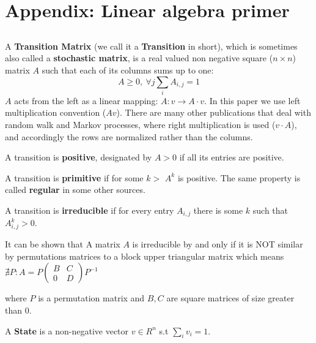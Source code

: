 \section{Appendix: Linear algebra primer}

\subsection*{}

\subsection*{}

\begin{mydef}
\label{Ax:def:transition} A \textbf{Transition Matrix } (we call
it a \textbf{Transition} in short), which is sometimes also called a
\textbf{stochastic matrix}, is a real valued non negative square
($n \times n$) matrix $A$ such that each of its columns sums up to one: $$A
\geq 0,\ \forall j \sum_i A_{i,j} = 1$$ $A$ acts from the left as a
linear mapping: $A:v \to A \cdot v$. In this paper we use left
multiplication convention ($Av$). There are many other publications
that deal with random walk and Markov processes, where right
multiplication is used ($v \cdot A$), and accordingly the rows are
normalized rather than the columns.

A transition is \textbf{positive}, designated by $A > 0$ if all its entries are positive.

A transition is \textbf{primitive} if for some $k>$ $A^k$ is positive. The same
property is called \textbf{regular} in some other sources.

A transition is \textbf{irreducible} if for every entry $A_{i,j}$ there is some $k$ such
that $A^k_{i,j} > 0$.

It can be shown that 
A matrix $A$ is 
irreducible by and only if it is NOT
similar by permutations matrices to a block upper triangular matrix
which means 
$
\nexists P : 
A =
P
\begin{pmatrix}
B & C \\
0 & D
\end{pmatrix}
P^{-1}
$

where $P$ is a permutation matrix and $B, C$ are square matrices of size greater than $0$.
\end{mydef}

\begin{mydef}
\label{Ax:def:state}
A \textbf{State} is a non-negative vector $v \in R^n$ s.t $\sum_i v_i = 1$.
\end{mydef}

